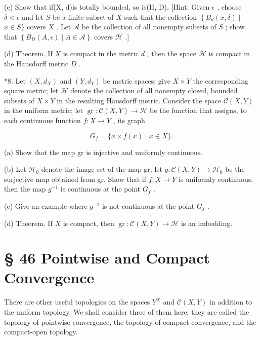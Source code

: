 (c) Show that if(X, d)is totally bounded, so is(H, D). [Hint: Given \(\epsilon\) , choose \(\delta  < \epsilon\) and let \(S\) be a finite subset of \(X\) such that the collection \(\left\{  {{B}_{d}\left( {x,\delta }\right)  \mid  }\right.\)  \(x \in  S\}\) covers \(X\) . Let \(\mathcal{A}\) be the collection of all nonempty subsets of \(S\) ; show that \(\left\{  {{B}_{D}\left( {A,\epsilon }\right)  \mid  A \in  \mathcal{A}}\right\}\) covers \(\mathcal{H}\) .]

(d) Theorem. If \(X\) is compact in the metric \(d\) , then the space \(\mathcal{H}\) is compact in the Hausdorff metric \(D\) .

*8. Let \(\left( {X,{d}_{X}}\right)\) and \(\left( {Y,{d}_{Y}}\right)\) be metric spaces; give \(X \times  Y\) the corresponding square metric; let \(\mathcal{H}\) denote the collection of all nonempty closed, bounded subsets of \(X \times  Y\) in the resulting Hausdorff metric. Consider the space \(\mathcal{C}\left( {X,Y}\right)\) in the uniform metric; let \(\operatorname{gr} : \mathcal{C}\left( {X,Y}\right)  \rightarrow  \mathcal{H}\) be the function that assigns, to each continuous function \(f : X \rightarrow  Y\) , its graph

\[
{G}_{f} = \{ x \times  f\left( x\right)  \mid  x \in  X\} .
\]

(a) Show that the map gr is injective and uniformly continuous.

(b) Let \({\mathcal{H}}_{0}\) denote the image set of the map gr; let \(g : \mathcal{C}\left( {X,Y}\right)  \rightarrow  {\mathcal{H}}_{0}\) be the surjective map obtained from gr. Show that if \(f : X \rightarrow  Y\) is uniformly continuous, then the map \({g}^{-1}\) is continuous at the point \({G}_{f}\) .

(c) Give an example where \({g}^{-1}\) is not continuous at the point \({G}_{f}\) .

(d) Theorem. If \(X\) is compact, then \(\operatorname{gr} : \mathcal{C}\left( {X,Y}\right)  \rightarrow  \mathcal{H}\) is an imbedding.

\section*{§ 46 Pointwise and Compact Convergence}

There are other useful topologies on the spaces \({Y}^{X}\) and \(\mathcal{C}\left( {X,Y}\right)\) in addition to the uniform topology. We shall consider three of them here; they are called the topology of pointwise convergence, the topology of compact convergence, and the compact-open topology.

